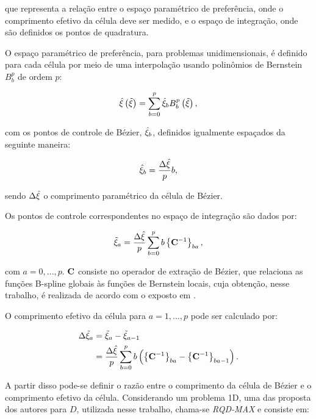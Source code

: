 \documentclass[tese_patricia]{subfiles}
\begin{document}
\noindent que representa a relação entre o espaço paramétrico de preferência, onde o comprimento efetivo da célula deve ser medido, e o espaço de integração, onde são definidos os pontos de quadratura.

O espaço paramétrico de preferência, para problemas unidimensionais, é definido para cada célula por meio de uma interpolação usando polinômios de Bernstein $B_{b}^{p}$ de ordem $p$:

\begin{align}
	\hat{\xi} \left(\tilde{\xi}\right) = \sum_{b=0}^{p} \hat{\xi}_b B_{b}^{p}\left(\tilde{\xi}\right),
\end{align}

\noindent com os pontos de controle de Bézier, $\hat{\xi}_b$, definidos igualmente espaçados da seguinte maneira:

\begin{align}
	\hat{\xi}_b = \frac{\Delta{\hat{\xi}}}{p}b,
\end{align}

\noindent sendo $\Delta{\hat{\xi}}$ o comprimento paramétrico da célula de Bézier. 

Os pontos de controle correspondentes no espaço de integração são dados por:

\begin{align}
	\tilde{\xi}_a = \frac{\Delta{\hat{\xi}}}{p} \sum_{b=0}^{p}b\left\{\mathbf{C}^{-1}\right\}_{ba},
\end{align}

\noindent com $a=0,...,p$. $\mathbf{C}$ consiste no operador de extração de Bézier, que relaciona as funções B-spline globais às funções de Bernstein locais, cuja obtenção, nesse trabalho, é realizada de acordo com o exposto em .

O comprimento efetivo da célula para $a = 1, ..., p$ pode ser calculado por:

\begin{align}
	\Delta{\tilde{\xi}_a} &= \tilde{\xi}_a - \tilde{\xi}_{a-1} \\
		           &= \frac{\Delta{\hat{\xi}}}{p} \sum_{b=0}^{p}b\left(\left\{\mathbf{C}^{-1}\right\}_{ba} - \left\{\mathbf{C}^{-1}\right\}_{ba-1}\right).
\end{align}


A partir disso pode-se definir o razão entre o comprimento da célula de Bézier e o comprimento efetivo da célula. Considerando um problema 1D, uma das proposta dos autores para $D$, utilizada nesse trabalho, chama-se \textit{RQD-MAX} e consiste em:
\end{document}
